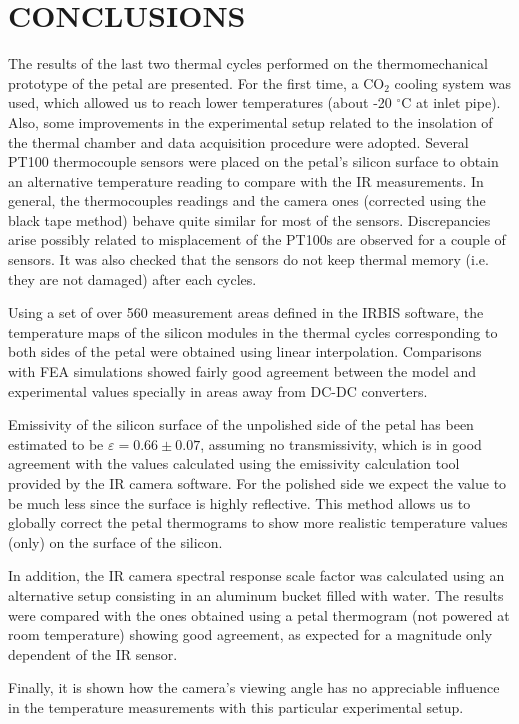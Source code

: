 \pagestyle{conclusions}

\section*{\uppercase{Conclusions}}\label{concl}
	\bigskip
	\bigskip
	The results of the last two thermal cycles performed on the thermomechanical prototype of the petal are presented. For the first time, a CO$_{2}$ cooling system was used, which allowed us to reach lower temperatures (about -20 $^{\circ}$C at inlet pipe). Also, some improvements in the experimental setup related to the insolation of the thermal chamber and data acquisition procedure were adopted. Several PT100 thermocouple sensors were placed on the petal’s silicon surface to obtain an alternative temperature reading to compare with the IR measurements. In general, the thermocouples readings and the camera ones (corrected using the black tape method) behave quite similar for most of the sensors. Discrepancies arise possibly related to misplacement of the PT100s are observed for a couple of sensors. It was also checked that the sensors do not keep thermal memory (i.e. they are not damaged) after each cycles.
	
	Using a set of over 560 measurement areas defined in the IRBIS software, the temperature maps of the silicon modules in the thermal cycles corresponding to both sides of the petal were obtained using linear interpolation. Comparisons with FEA simulations showed fairly good agreement between the model and experimental values specially in areas away from DC-DC converters.
	
	Emissivity of the silicon surface of the unpolished side of the petal has been estimated to be $\varepsilon=0.66 \pm 0.07$, assuming no transmissivity, which is in good agreement with the values calculated using the emissivity calculation tool provided by the IR camera software. For the polished side we expect the value to be much less since the surface is highly reflective. This method allows us to globally correct the petal thermograms to show more realistic temperature values (only) on the surface of the silicon. 
	
	In addition, the IR camera spectral response scale factor was calculated using an alternative setup consisting in an aluminum bucket filled with water. The results were compared with the ones obtained using a petal thermogram (not powered at room temperature) showing good agreement, as expected for a magnitude only dependent of the IR sensor.
	
	Finally, it is shown how the camera’s viewing angle has no appreciable influence in the temperature measurements with this particular experimental setup.
	 
	